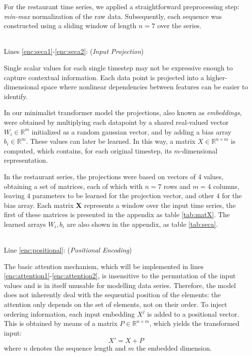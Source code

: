 \documentclass[algorithms,article,submit,pdftex,moreauthors]{Definitions/mdpi}
\begin{document}
For the restaurant time series, we applied a straightforward preprocessing step: \textit{min-max} normalization of the raw data. Subsequently, each sequence was constructed using a sliding window of length $n = 7$ over the series.

~\\Lines \ref{enc:seca1}-\ref{enc:seca2}: (\textit{Input Projection})

Single scalar values for each single timestep may not be expressive enough to capture contextual information. Each data point is projected into a higher-dimensional space where nonlinear dependencies between features can be easier to identify. 

In our minimalist transformer model the projections, also known as {\em embeddings}, were obtained by multiplying each datapoint by a shared real-valued vector $W_i \in \mathbb{R}^m$ initialized as a random gaussian vector, and by adding a bias array $b_i \in \mathbb{R}^m$. These values can later be learned. In this way, a matrix $X \in \mathbb{R}^{n\times m}$ is computed, which contains, for each original timestep, its $m$-dimensional representation.

In the restaurant series, the projections were based on vectors of 4 values, obtaining a set of matrices, each of which with $n=7$ rows and $m=4$ columns, leaving $4$ parameters to be learned for the projection vector, and other $4$ for the bias array. Each matrix {\bf X} represents a window over the input time series, the first of these matrices is presented in the appendix as table \ref{tab:matX}. The learned arrays $W_i, b_i$ are also shown in the appendix, as table \ref{tab:seca}.

~\\Line \ref{enc:positional}: (\textit{Positional Encoding})

The basic attention mechanism, which will be implemented in lines \ref{enc:attention1}-\ref{enc:attention2}, is insensitive to the permutation of the input values \cite{VSPU17} and is in itself unusable for modelling data series. Therefore, the model does not inherently deal with the sequential position of the elements: the attention only depends on the set of elements, not on their order. To inject ordering information, each input embedding $X^j$ is added to a positional vector. 
This is obtained by means of a matrix $P \in \mathbb{R}^{n \times m}$, which yields the transformed input: 
\begin{equation}
    X' = X + P
\end{equation}
where $n$ denotes the sequence length and $m$ the embedded dimension.
\end{document}
